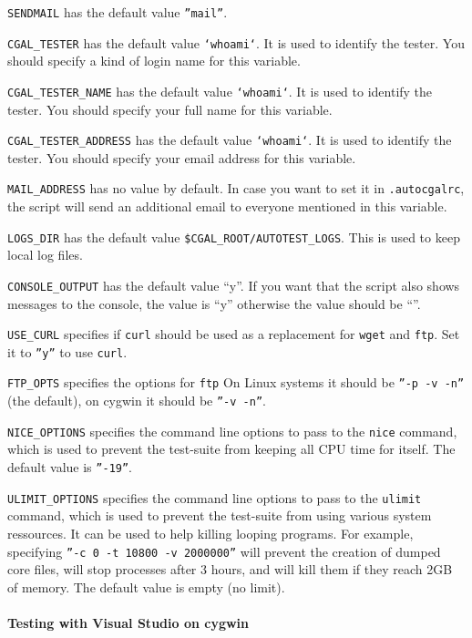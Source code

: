 {\tt SENDMAIL} has the default value {\tt ''mail''}.

{\tt CGAL\_TESTER} has the default value {\tt `whoami`}.  It is used to
identify the tester.  You should specify a kind of login name for this
variable.

{\tt CGAL\_TESTER\_NAME} has the default value {\tt `whoami`}.  It is used to
identify the tester.  You should specify your full name for this variable.

{\tt CGAL\_TESTER\_ADDRESS} has the default value {\tt `whoami`}.  It is used
to identify the tester.  You should specify your email address for this
variable.

{\tt MAIL\_ADDRESS} has no value by default. In case you want to
set it in {\tt .autocgalrc}, the script will send an additional email to
everyone mentioned in this variable.

{\tt LOGS\_DIR} has the default value {\tt \$CGAL\_ROOT/AUTOTEST\_LOGS}.  This
is used to keep local log files.

{\tt CONSOLE\_OUTPUT} has the default value ``y''. If you want that the script
 also shows messages to the console, the value is ``y'' otherwise the value
should be ``''.

{\tt USE\_CURL} specifies if {\tt curl} should be used as a replacement for
{\tt wget} and {\tt ftp}.  Set it to {\tt ''y''} to use {\tt curl}.

{\tt FTP\_OPTS} specifies the options for {\tt ftp}   On Linux systems 
it should be {\tt ''-p -v -n''} (the default), on cygwin it should be {\tt ''-v -n''}.

{\tt NICE\_OPTIONS} specifies the command line options to pass to the
{\tt nice} command, which is used to prevent the test-suite from keeping
all CPU time for itself.  The default value is {\tt ''-19''}.

{\tt ULIMIT\_OPTIONS} specifies the command line options to pass to the
{\tt ulimit} command, which is used to prevent the test-suite from using
various system ressources.  It can be used to help killing looping programs.
For example, specifying {\tt ''-c 0 -t 10800 -v 2000000''} will prevent
the creation of dumped core files, will stop processes after 3 hours,
and will kill them if they reach 2GB of memory.
The default value is empty (no limit).

\paragraph{Testing with Visual Studio on cygwin} ~

